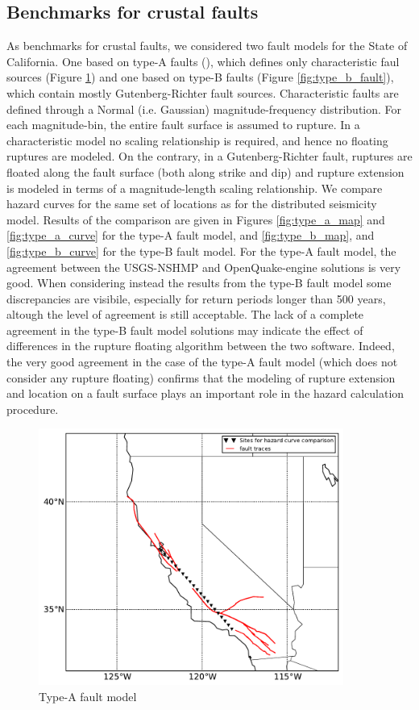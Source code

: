 \subsection{Benchmarks for crustal faults}
As benchmarks for crustal faults, we considered two fault models for the State of California. One based on type-A faults (\cite{petersen2008}), which defines only characteristic faul sources (Figure \ref{fig:type_a_fault}) and one based on type-B faults (Figure \ref{fig:type_b_fault}), which contain mostly Gutenberg-Richter fault sources. Characteristic faults are defined through a Normal (i.e. Gaussian) magnitude-frequency distribution. For each magnitude-bin, the entire fault surface is assumed to rupture. In a characteristic model no scaling relationship is required, and hence no floating ruptures are modeled. On the contrary, in a Gutenberg-Richter fault, ruptures are floated along the fault surface (both along strike and dip) and rupture extension is modeled in terms of a magnitude-length scaling relationship. We compare hazard curves for the same set of locations as for the distributed seismicity model. Results of the comparison are given in Figures \ref{fig:type_a_map} and \ref{fig:type_a_curve} for the type-A fault model, and \ref{fig:type_b_map}, and \ref{fig:type_b_curve} for the type-B fault model. For the type-A fault model, the agreement between the USGS-NSHMP and OpenQuake-engine solutions is very good. When considering instead the results from the type-B fault model some discrepancies are visibile, especially for return periods longer than 500 years, altough the level of agreement is still acceptable. The lack of a complete agreement in the type-B fault model solutions may indicate the effect of differences in the rupture floating algorithm between the two software. Indeed, the very good agreement in the case of the type-A fault model (which does not consider any rupture floating) confirms that the modeling of rupture extension and location on a fault surface plays an important role in the hazard calculation procedure.

\begin{figure}
\centering
\includegraphics[width=10cm]{./qareport/pictures/aFault_aPriori_D2pt1.pdf}
\caption{Type-A fault model}
\label{fig:type_a_fault}
\end{figure}

